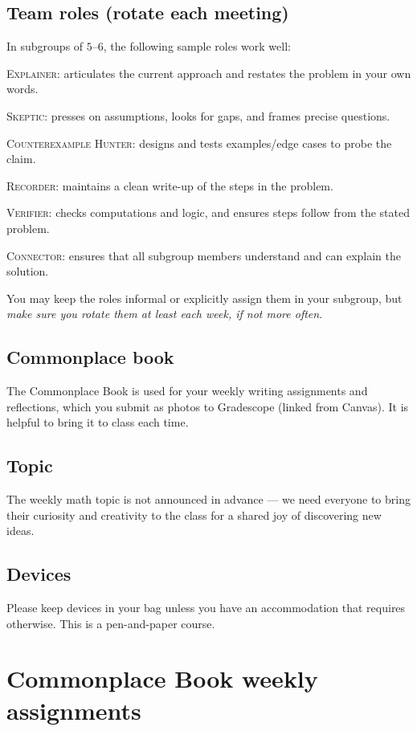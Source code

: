 \documentclass[oneside,11pt]{amsart}
\begin{document}
\subsection{Team roles (rotate each meeting)}
In subgroups of $5$--$6$, the following sample roles work well:
\begin{compactitem}
    \item \textsc{Explainer}: articulates the current approach and restates the problem in your own words.
    \item \textsc{Skeptic}: presses on assumptions, looks for gaps, and frames precise questions.
    \item \textsc{Counterexample Hunter}: designs and tests examples/edge cases to probe the claim.
    \item \textsc{Recorder}: maintains a clean write-up of the steps in the problem.
    \item \textsc{Verifier}: checks computations and logic, and ensures steps follow from the stated problem.
    \item \textsc{Connector}: ensures that all subgroup members understand and can explain the solution.
\end{compactitem}
You may keep the roles informal or explicitly assign them in your subgroup, but \emph{make sure you rotate them at least each week, if not more often}.

\subsection{Commonplace book}
The Commonplace Book is used for your weekly writing assignments and reflections, which you submit as photos to Gradescope (linked from Canvas). It is helpful to bring it to class each time.

\subsection{Topic}
The weekly math topic is not announced in advance --- we need everyone to bring their curiosity and creativity to the class for a shared joy of discovering new ideas.

\subsection{Devices}
Please keep devices in your bag unless you have an accommodation that requires otherwise. This is a pen-and-paper course.

\section{Commonplace Book weekly assignments}
\end{document}
